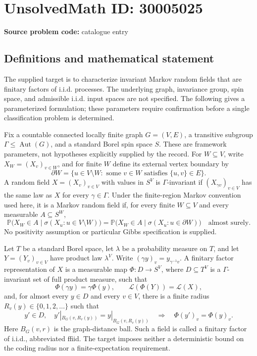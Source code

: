\documentclass[11pt]{article}
\begin{document}
\section*{UnsolvedMath ID: 30005025}
\textbf{Source problem code:} catalogue entry
\subsection{Definitions and mathematical statement}
The supplied target is to characterize invariant Markov random fields that are finitary factors of i.i.d. processes. The underlying graph, invariance group, spin space, and admissible i.i.d. input spaces are not specified. The following gives a parameterized formulation; these parameters require confirmation before a single classification problem is determined.

Fix a countable connected locally finite graph \(G=(V,E)\), a transitive subgroup \(\Gamma\leq\operatorname{Aut}(G)\), and a standard Borel spin space \(S\). These are framework parameters, not hypotheses explicitly supplied by the record. For \(W\subseteq V\), write \(X_W=(X_v)_{v\in W}\), and for finite \(W\) define its external vertex boundary by
\[
\partial W=\{u\in V\setminus W:\text{ some }v\in W\text{ satisfies }\{u,v\}\in E\}.
\]
A random field \(X=(X_v)_{v\in V}\) with values in \(S^V\) is \(\Gamma\)-invariant if \((X_{\gamma v})_{v\in V}\) has the same law as \(X\) for every \(\gamma\in\Gamma\). Under the finite-region Markov convention used here, it is a Markov random field if, for every finite \(W\subseteq V\) and every measurable \(A\subseteq S^W\),
\[
\mathbb P\bigl(X_W\in A\mid\sigma(X_u:u\in V\setminus W)\bigr)
=
\mathbb P\bigl(X_W\in A\mid\sigma(X_u:u\in\partial W)\bigr)
\quad\text{almost surely}.
\]
No positivity assumption or particular Gibbs specification is supplied.

Let \(T\) be a standard Borel space, let \(\lambda\) be a probability measure on \(T\), and let \(Y=(Y_v)_{v\in V}\) have product law \(\lambda^V\). Write \((\gamma y)_v=y_{\gamma^{-1}v}\). A finitary factor representation of \(X\) is a measurable map \(\Phi:D\to S^V\), where \(D\subseteq T^V\) is a \(\Gamma\)-invariant set of full product measure, such that
\[
\Phi(\gamma y)=\gamma\Phi(y),\qquad
\mathcal L(\Phi(Y))=\mathcal L(X),
\]
and, for almost every \(y\in D\) and every \(v\in V\), there is a finite radius \(R_v(y)\in\{0,1,2,\ldots\}\) such that
\[
y'\in D,\quad y'|_{B_G(v,R_v(y))}=y|_{B_G(v,R_v(y))}
\quad\Longrightarrow\quad
\Phi(y')_v=\Phi(y)_v.
\]
Here \(B_G(v,r)\) is the graph-distance ball. Such a field is called a finitary factor of i.i.d., abbreviated ffiid. The target imposes neither a deterministic bound on the coding radius nor a finite-expectation requirement.
\end{document}
